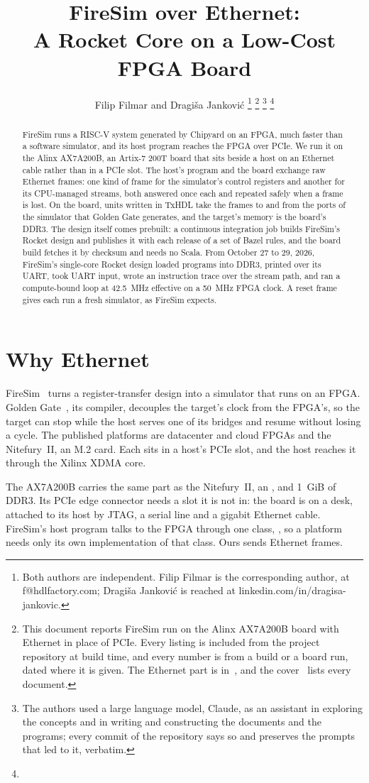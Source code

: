 \documentclass[journal,9pt]{IEEEtran}
\title{FireSim over Ethernet:\\A Rocket Core on a Low-Cost FPGA Board}
\author{Filip Filmar and Dragiša Janković%
\thanks{Both authors are independent. Filip Filmar is the
corresponding author, at f@hdlfactory.com; Dragiša Janković is
reached at linkedin.com/in/dragisa-jankovic.}%
\thanks{This document reports FireSim run on the Alinx AX7A200B board
with Ethernet in place of PCIe. Every listing is included from the
project repository \code{HDL/txhdl} at build time, and every number is
from a build or a board run, dated where it is given. The Ethernet
part is in~\cite{eth}, and the cover~\cite{cover} lists every
document.}%
\thanks{The authors used a large language model, Claude, as an
assistant in exploring the concepts and in writing and constructing
the documents and the programs; every commit of the repository says
so and preserves the prompts that led to it, verbatim.}%
\thanks{\buildstamp}}
\begin{document}
\maketitle

\begin{abstract}
FireSim runs a RISC-V system generated by Chipyard on an FPGA, much
faster than a software simulator, and its host program reaches the FPGA
over PCIe. We run it on the Alinx AX7A200B, an Artix-7 200T board that
sits beside a host on an Ethernet cable rather than in a PCIe slot. The
host's program and the board exchange raw Ethernet frames: one kind of
frame for the simulator's control registers and another for its
CPU-managed streams, both answered once each and repeated safely when a
frame is lost. On the board, units written in TxHDL take the frames to
and from the ports of the simulator that Golden Gate generates, and the
target's memory is the board's DDR3. The design itself comes prebuilt:
a continuous integration job builds FireSim's Rocket design and
publishes it with each release of a set of Bazel rules, and the board
build fetches it by checksum and needs no Scala. From October 27 to 29,
2026, FireSim's single-core Rocket design loaded programs into DDR3,
printed over its UART, took UART input, wrote an instruction trace over
the stream path, and ran a compute-bound loop at 42.5~MHz effective on a
50~MHz FPGA clock. A reset frame gives each run a fresh simulator, as
FireSim expects.
\end{abstract}

\section{Why Ethernet}
\label{sec:f-why}

FireSim~\cite{firesim} turns a register-transfer design into a
simulator that runs on an FPGA. Golden Gate~\cite{goldengate}, its
compiler, decouples the target's clock from the FPGA's, so the target
can stop while the host serves one of its bridges and resume without
losing a cycle. The published platforms are datacenter and cloud FPGAs
and the Nitefury~II, an M.2 card. Each sits in a host's PCIe slot, and
the host reaches it through the Xilinx XDMA core.

The AX7A200B carries the same part as the Nitefury~II, an
, and 1~GiB of DDR3. Its PCIe edge connector
needs a slot it is not in: the board is on a desk, attached to its host
by JTAG, a serial line and a gigabit Ethernet cable. FireSim's host
program talks to the FPGA through one class, , so a
platform needs only its own implementation of that class. Ours sends
Ethernet frames.
\end{document}
